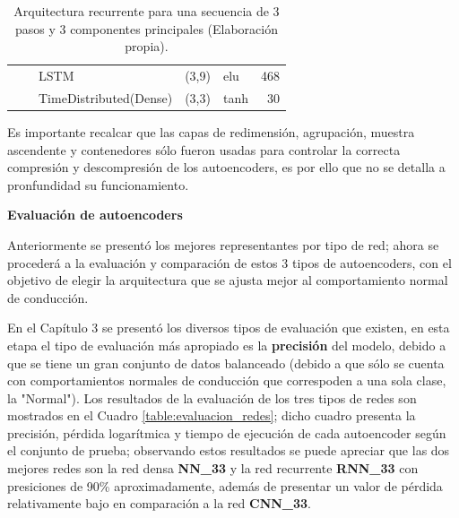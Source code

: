 \begin{table}[H]
\begin{center}
\begin{tabular}{ll|l|r|l|r|}
\multicolumn{1}{|l|}{}                              &                             & LSTM                               & (3,9)                                & elu                                     & 468                                         \\ \cline{3-6} 
\multicolumn{1}{|l|}{}                              &                             & TimeDistributed(Dense)             & (3,3)                                & tanh                                     & 30                                          \\ \hline
\end{tabular}
\end{center}
\caption{Arquitectura recurrente para una secuencia de 3 pasos y 3 componentes principales (Elaboraci\'{o}n propia).}
\label{table:rnn33}
\end{table}

Es importante recalcar que las capas de redimensi\'{o}n, agrupaci\'{o}n, muestra ascendente y contenedores s\'{o}lo fueron usadas para controlar la correcta compresi\'{o}n y descompresi\'{o}n de los autoencoders, es por ello que no se detalla a pronfundidad su funcionamiento.

\vspace{5mm} %

\textbf{Evaluaci\'{o}n de autoencoders}

\vspace{5mm} %

Anteriormente se present\'{o} los mejores representantes por tipo de red; ahora se proceder\'{a} a la evaluaci\'{o}n y comparaci\'{o}n de estos 3 tipos de autoencoders, con el objetivo de elegir la arquitectura que se ajusta mejor al comportamiento normal de conducci\'{o}n.

\vspace{5mm} %

En el Cap\'{i}tulo 3 se present\'{o} los diversos tipos de evaluaci\'{o}n que existen, en esta etapa el tipo de evaluaci\'{o}n m\'{a}s apropiado es la \textbf{precisi\'{o}n} del modelo, debido a que se tiene un gran conjunto de datos balanceado (debido a que s\'{o}lo se cuenta con comportamientos normales de conducci\'{o}n que correspoden a una sola clase, la "Normal"). Los resultados de la evaluaci\'{o}n de los tres tipos de redes son mostrados en el Cuadro \ref{table:evaluacion_redes}; dicho cuadro presenta la precisi\'{o}n, p\'{e}rdida logar\'{i}tmica y tiempo de ejecuci\'{o}n de cada autoencoder seg\'{u}n el conjunto de prueba; observando estos resultados se puede apreciar que las dos mejores redes son la red densa \textbf{NN\_33} y la red recurrente \textbf{RNN\_33} con presiciones de 90\% aproximadamente, adem\'{a}s de presentar un valor de p\'{e}rdida relativamente bajo en comparaci\'{o}n a la red \textbf{CNN\_33}.

